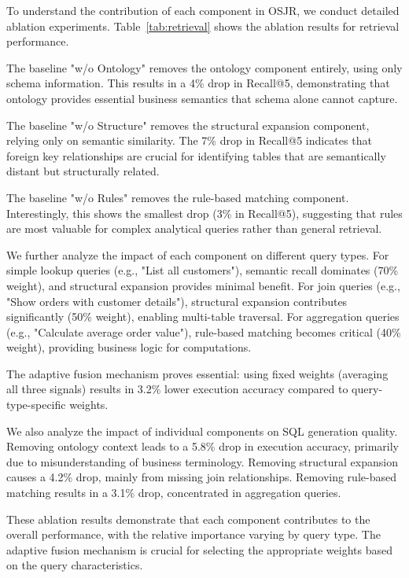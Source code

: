 \documentclass[sigconf, nonatbib]{acmart}
\begin{document}
To understand the contribution of each component in OSJR, we conduct detailed ablation experiments. Table~\ref{tab:retrieval} shows the ablation results for retrieval performance.

The baseline "w/o Ontology" removes the ontology component entirely, using only schema information. This results in a 4\% drop in Recall@5, demonstrating that ontology provides essential business semantics that schema alone cannot capture.

The baseline "w/o Structure" removes the structural expansion component, relying only on semantic similarity. The 7\% drop in Recall@5 indicates that foreign key relationships are crucial for identifying tables that are semantically distant but structurally related.

The baseline "w/o Rules" removes the rule-based matching component. Interestingly, this shows the smallest drop (3\% in Recall@5), suggesting that rules are most valuable for complex analytical queries rather than general retrieval.

We further analyze the impact of each component on different query types. For simple lookup queries (e.g., "List all customers"), semantic recall dominates (70\% weight), and structural expansion provides minimal benefit. For join queries (e.g., "Show orders with customer details"), structural expansion contributes significantly (50\% weight), enabling multi-table traversal. For aggregation queries (e.g., "Calculate average order value"), rule-based matching becomes critical (40\% weight), providing business logic for computations.

The adaptive fusion mechanism proves essential: using fixed weights (averaging all three signals) results in 3.2\% lower execution accuracy compared to query-type-specific weights.

We also analyze the impact of individual components on SQL generation quality. Removing ontology context leads to a 5.8\% drop in execution accuracy, primarily due to misunderstanding of business terminology. Removing structural expansion causes a 4.2\% drop, mainly from missing join relationships. Removing rule-based matching results in a 3.1\% drop, concentrated in aggregation queries.

These ablation results demonstrate that each component contributes to the overall performance, with the relative importance varying by query type. The adaptive fusion mechanism is crucial for selecting the appropriate weights based on the query characteristics.
\end{document}
